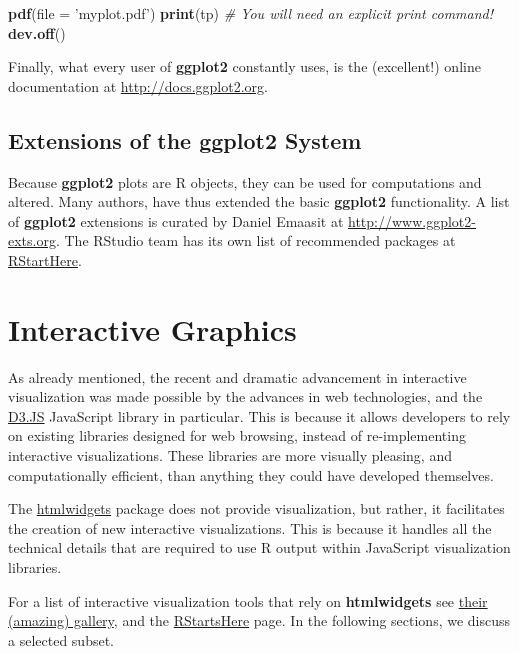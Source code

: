 \documentclass[]{book}
\newenvironment{Shaded}{\begin{snugshade}}{\end{snugshade}}
\newcommand{\KeywordTok}[1]{\textcolor[rgb]{0.13,0.29,0.53}{\textbf{#1}}}
\newcommand{\DataTypeTok}[1]{\textcolor[rgb]{0.13,0.29,0.53}{#1}}
\newcommand{\StringTok}[1]{\textcolor[rgb]{0.31,0.60,0.02}{#1}}
\newcommand{\CommentTok}[1]{\textcolor[rgb]{0.56,0.35,0.01}{\textit{#1}}}
\newcommand{\NormalTok}[1]{#1}
\theoremstyle{definition}
\theoremstyle{definition}
\theoremstyle{definition}
\theoremstyle{remark}
\begin{document}
\begin{Shaded}
\begin{Highlighting}[]
\KeywordTok{pdf}\NormalTok{(}\DataTypeTok{file =} \StringTok{'myplot.pdf'}\NormalTok{)}
\KeywordTok{print}\NormalTok{(tp) }\CommentTok{# You will need an explicit print command!}
\KeywordTok{dev.off}\NormalTok{()}
\end{Highlighting}
\end{Shaded}

Finally, what every user of \textbf{ggplot2} constantly uses, is the
(excellent!) online documentation at \url{http://docs.ggplot2.org}.

\subsection{Extensions of the ggplot2
System}\label{extensions-of-the-ggplot2-system}

Because \textbf{ggplot2} plots are R objects, they can be used for
computations and altered. Many authors, have thus extended the basic
\textbf{ggplot2} functionality. A list of \textbf{ggplot2} extensions is
curated by Daniel Emaasit at
\href{http://www.ggplot2-exts.org/gallery/}{http://www.ggplot2-exts.org}.
The RStudio team has its own list of recommended packages at
\href{https://github.com/rstudio/RStartHere}{RStartHere}.

\section{Interactive Graphics}\label{interactive-graphics}

As already mentioned, the recent and dramatic advancement in interactive
visualization was made possible by the advances in web technologies, and
the \href{https://d3js.org/}{D3.JS} JavaScript library in particular.
This is because it allows developers to rely on existing libraries
designed for web browsing, instead of re-implementing interactive
visualizations. These libraries are more visually pleasing, and
computationally efficient, than anything they could have developed
themselves.

The \href{http://www.htmlwidgets.org/}{htmlwidgets} package does not
provide visualization, but rather, it facilitates the creation of new
interactive visualizations. This is because it handles all the technical
details that are required to use R output within JavaScript
visualization libraries.

For a list of interactive visualization tools that rely on
\textbf{htmlwidgets} see \href{http://gallery.htmlwidgets.org/}{their
(amazing) gallery}, and the
\href{https://github.com/rstudio/RStartHere}{RStartsHere} page. In the
following sections, we discuss a selected subset.
\end{document}
